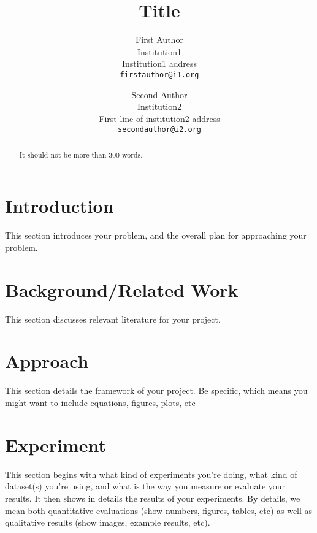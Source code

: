\documentclass[10pt,twocolumn,letterpaper]{article}
\begin{document}
\title{Title}

\author{First Author\\
Institution1\\
Institution1 address\\
{\tt\small firstauthor@i1.org}
\and
Second Author\\
Institution2\\
First line of institution2 address\\
{\tt\small secondauthor@i2.org}
}

\maketitle

\begin{abstract}
   It should not be more than 300 words.
\end{abstract}

\section{Introduction}
This section introduces your problem, and the overall plan for approaching your problem. 

\section{Background/Related Work}
This section discusses relevant literature for your project.  

\section{Approach}
This section details the framework of your project. Be specific, which means you might want to include equations, figures, plots, etc

\section{Experiment}
This section begins with what kind of experiments you're doing, what kind of dataset(s) you're using, and what is the way you measure or evaluate your results. It then shows in details the results of your experiments. By details, we mean both quantitative evaluations (show numbers, figures, tables, etc) as well as qualitative results (show images, example results, etc).
\end{document}

